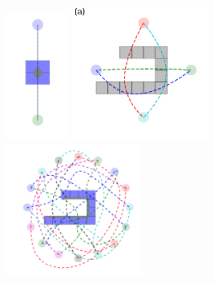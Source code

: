 \documentclass{svproc}
\begin{document}
\begin{figure}
\centering
\includegraphics[width=0.18\textwidth]{images/ex_16.pdf}
\hfill
\includegraphics[width=0.4\textwidth]{images/ex_17.pdf}
\hfill
\includegraphics[width=0.40\textwidth]{images/ex_18.pdf}

\end{figure}
\end{document}
